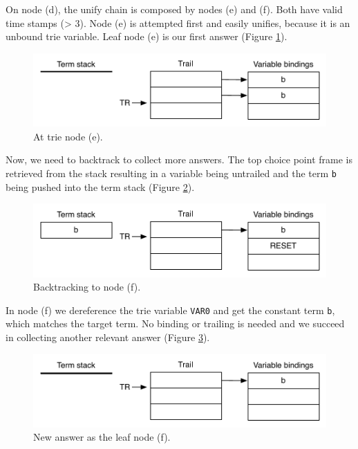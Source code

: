 On node (d), the unify chain is composed by nodes (e) and (f). Both have valid time stamps (> 3).
Node (e) is attempted first and easily unifies, because it is an unbound trie variable.
Leaf node (e) is our first answer (Figure \ref{fig:collect_ex3}).

\begin{figure}[H]
  \centering
    \includegraphics[scale=0.6]{collect_ex3.pdf}
  \caption{At trie node (e).}
  \label{fig:collect_ex3}
\end{figure}

Now, we need to backtrack to collect more answers. The top choice point frame is retrieved from the stack resulting in a variable being untrailed and the term \texttt{b} being pushed into the term stack (Figure \ref{fig:collect_ex4}).

\begin{figure}[H]
  \centering
    \includegraphics[scale=0.6]{collect_ex4.pdf}
  \caption{Backtracking to node (f).}
  \label{fig:collect_ex4}
\end{figure}

In node (f) we dereference the trie variable \texttt{VAR0} and get the constant term \texttt{b}, which matches the target term. No binding or trailing is needed and we succeed in collecting another relevant answer (Figure \ref{fig:collect_ex5}).

\begin{figure}[H]
  \centering
    \includegraphics[scale=0.6]{collect_ex5.pdf}
  \caption{New answer as the leaf node (f).}
  \label{fig:collect_ex5}
\end{figure}

